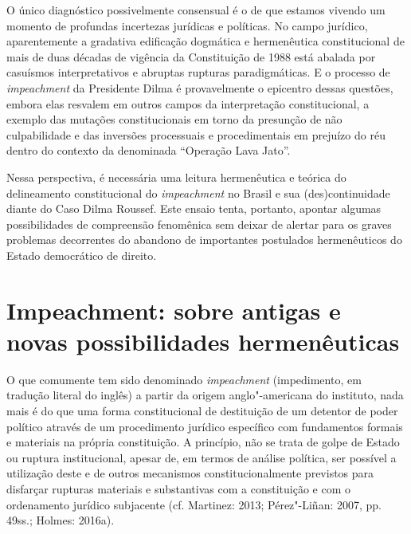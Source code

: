 O único diagnóstico possivelmente consensual é o de que estamos vivendo
um momento de profundas incertezas jurídicas e políticas. No campo
jurídico, aparentemente a gradativa edificação dogmática e hermenêutica
constitucional de mais de duas décadas de vigência da Constituição de
1988 está abalada por casuísmos interpretativos e abruptas rupturas
paradigmáticas. E o processo de \emph{impeachment} da Presidente Dilma é
provavelmente o epicentro dessas questões, embora elas resvalem em
outros campos da interpretação constitucional, a exemplo das mutações
constitucionais em torno da presunção de não culpabilidade e das
inversões processuais e procedimentais em prejuízo do réu dentro do
contexto da denominada ``Operação Lava Jato''.

Nessa perspectiva, é necessária uma leitura hermenêutica e teórica do
delineamento constitucional do \emph{impeachment} no Brasil e sua
(des)continuidade diante do Caso Dilma Roussef. Este ensaio tenta,
portanto, apontar algumas possibilidades de compreensão fenomênica sem
deixar de alertar para os graves problemas decorrentes do abandono de
importantes postulados hermenêuticos do Estado democrático de direito.

\section{Impeachment: sobre antigas e novas possibilidades
  hermenêuticas}

O que comumente tem sido denominado \emph{impeachment} (impedimento, em
tradução literal do inglês) a partir da origem anglo"-americana do
instituto, nada mais é do que uma forma constitucional de destituição de
um detentor de poder político através de um procedimento jurídico
específico com fundamentos formais e materiais na própria constituição.
A princípio, não se trata de golpe de Estado ou ruptura institucional,
apesar de, em termos de análise política, ser possível a utilização
deste e de outros mecanismos constitucionalmente previstos para
disfarçar rupturas materiais e substantivas com a constituição e com o
ordenamento jurídico subjacente (cf. Martinez: 2013; Pérez"-Liñan: 2007,
pp. 49ss.; Holmes: 2016a).

